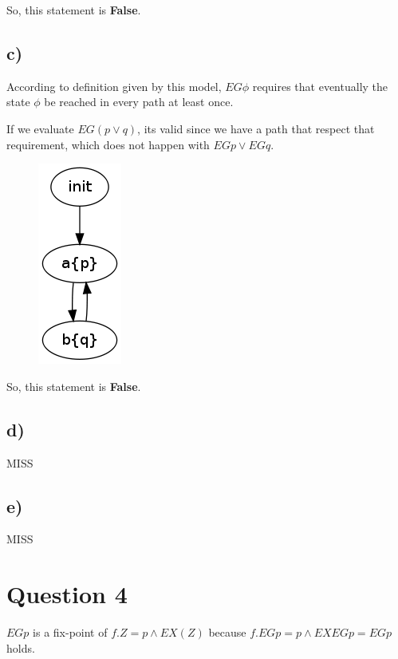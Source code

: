 \documentclass[a4paper]{article}
\begin{document}
So, this statement is \textbf{False}.

\subsection*{c)}

According to definition given by this model, $EG \phi $ requires that eventually the state $\phi$ be reached in every path at least once. 

If we evaluate $EG (p \lor q)$, its valid since we have a path that respect that requirement, which does not happen with 
$EG p \lor EG q$.

\begin{figure}[h]
		\centering
		\includegraphics[scale=0.50]{img/3c}
		\label{fig:3c}
\end{figure}

So, this statement is \textbf{False}.

\subsection*{d)}

MISS


\subsection*{e)}

MISS


\section{Question 4}

$EG p$ is a fix-point of $f.Z = p \land EX(Z)$ because $f.EG p = p \land EX EG p=EG p$ holds.
\end{document}
